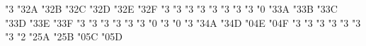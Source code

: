 {  \mathchardef\therefore            "3\hex{}
  \mathchardef\because              "3\hex\msamfam 2A
  \mathchardef\doteqdot             "3\hex\msamfam 2B
  \let\Doteq\doteqdot
  \mathchardef\triangleq            "3\hex\msamfam 2C
  \mathchardef\precsim              "3\hex\msamfam 2D
  \mathchardef\lesssim              "3\hex\msamfam 2E
  \mathchardef\lessapprox           "3\hex\msamfam 2F
  \mathchardef\eqslantless          "3\hex{}
  \mathchardef\eqslantgtr           "3\hex{}
  \mathchardef\curlyeqprec          "3\hex{}
  \mathchardef\curlyeqsucc          "3\hex{}
  \mathchardef\preccurlyeq          "3\hex{}
  \mathchardef\leqq                 "3\hex{}
  \mathchardef\leqslant             "3\hex{}
  \mathchardef\lessgtr              "3\hex{}
  \mathchardef\backprime            "0\hex{}
  \mathchardef\risingdotseq         "3\hex\msamfam 3A
  \mathchardef\fallingdotseq        "3\hex\msamfam 3B
  \mathchardef\succcurlyeq          "3\hex\msamfam 3C
  \mathchardef\geqq                 "3\hex\msamfam 3D
  \mathchardef\geqslant             "3\hex\msamfam 3E
  \mathchardef\gtrless              "3\hex\msamfam 3F
  \mathchardef\sqsubset             "3\hex{}
  \mathchardef\sqsupset             "3\hex{}
  \mathchardef\vartriangleright     "3\hex{}
  \mathchardef\vartriangleleft      "3\hex{}
  \mathchardef\trianglerighteq      "3\hex{}
  \mathchardef\trianglelefteq       "3\hex{}
  \mathchardef\bigstar              "0\hex{}
  \mathchardef\between              "3\hex{}
  \mathchardef\blacktriangledown    "0\hex{}
  \mathchardef\blacktriangleright   "3\hex{}
  \mathchardef\blacktriangleleft    "3\hex\msamfam 4A
  \mathchardef\vartriangle          "3\hex\msamfam 4D
  \mathchardef\blacktriangle        "0\hex\msamfam 4E
  \mathchardef\triangledown         "0\hex\msamfam 4F
  \mathchardef\eqcirc               "3\hex{}
  \mathchardef\lesseqgtr            "3\hex{}
  \mathchardef\gtreqless            "3\hex{}
  \mathchardef\lesseqqgtr           "3\hex{}
  \mathchardef\gtreqqless           "3\hex{}
  \mathchardef\Rrightarrow          "3\hex{}
  \mathchardef\Lleftarrow           "3\hex{}
  \mathchardef\veebar               "2\hex{}
  \mathchardef\barwedge             "2\hex\msamfam 5A
  \mathchardef\doublebarwedge       "2\hex\msamfam 5B
  \mathchardef\angle                "0\hex\msamfam 5C
  \mathchardef\measuredangle        "0\hex\msamfam 5D
}
